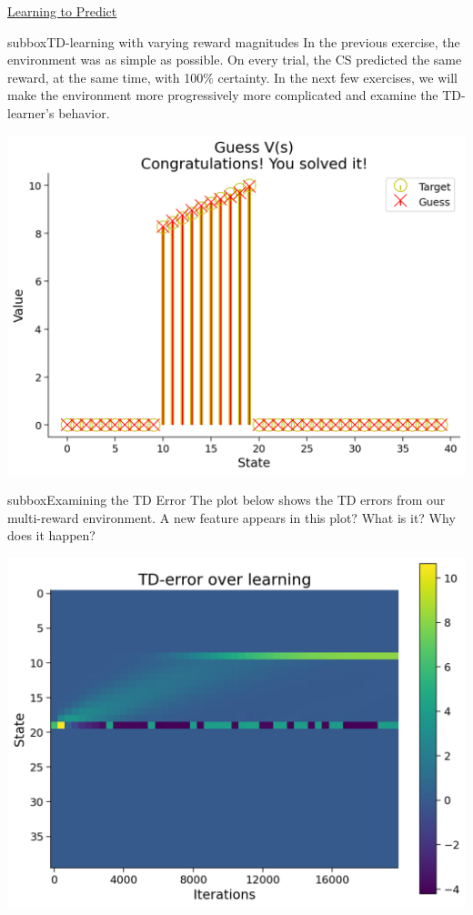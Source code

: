 \begin{textbox}{\href{https://compneuro.neuromatch.io/tutorials/W3D4_ReinforcementLearning/student/W3D4_Tutorial1.html}{Learning to Predict } }
\begin{subbox}{subbox}{TD-learning with varying reward magnitudes}
\scriptsize
In the previous exercise, the environment was as simple as possible. On every trial, the CS predicted the same reward, at the same time, with 100\% certainty. In the next few exercises, we will make the environment more progressively more complicated and examine the TD-learner's behavior.
\begin{center}
    
\includegraphics[scale=0.15]{Figures/RL/RL_Figure4.png}
\end{center}

\end{subbox}
\begin{subbox}{subbox}{Examining the TD Error}
\scriptsize
The plot below shows the TD errors from our multi-reward environment. A new feature appears in this plot? What is it? Why does it happen?
\begin{center}
    
\includegraphics[scale=0.15]{Figures/RL/RL_Figure5.png}
\end{center}


\end{subbox}
\end{textbox}
